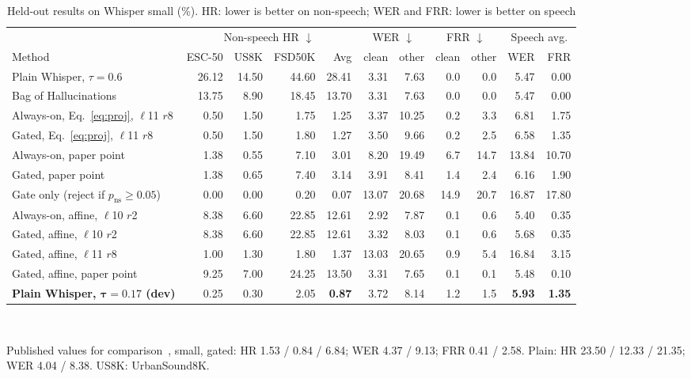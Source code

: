 \documentclass[conference,a4paper]{IEEEtran}
\newcommand{\pns}{p_{\mathrm{ns}}}
\begin{document}
\begin{table}[!t]
\centering
\caption{Held-out results on Whisper small (\%). HR: lower is better on non-speech; WER and FRR: lower is better on speech}
\label{tab:main}
\setlength{\tabcolsep}{5pt}
\begin{tabular}{@{}l rrr r rr rr rr@{}}
\toprule
& \multicolumn{4}{c}{Non-speech HR $\downarrow$} & \multicolumn{2}{c}{WER $\downarrow$} & \multicolumn{2}{c}{FRR $\downarrow$} & \multicolumn{2}{c}{Speech avg.} \\
\cmidrule(lr){2-5}\cmidrule(lr){6-7}\cmidrule(lr){8-9}\cmidrule(l){10-11}
Method & ESC-50 & US8K & FSD50K & Avg & clean & other & clean & other & WER & FRR \\
\midrule
Plain Whisper, $\tau = 0.6$ & 26.12 & 14.50 & 44.60 & 28.41 & 3.31 & 7.63 & 0.0 & 0.0 & 5.47 & 0.00 \\
Bag of Hallucinations~\cite{baranski2025boh} & 13.75 & 8.90 & 18.45 & 13.70 & 3.31 & 7.63 & 0.0 & 0.0 & 5.47 & 0.00 \\
\midrule
Always-on, Eq.~\eqref{eq:proj}, $\ell$11 $r$8 & 0.50 & 1.50 & 1.75 & 1.25 & 3.37 & 10.25 & 0.2 & 3.3 & 6.81 & 1.75 \\
Gated, Eq.~\eqref{eq:proj}, $\ell$11 $r$8 & 0.50 & 1.50 & 1.80 & 1.27 & 3.50 & 9.66 & 0.2 & 2.5 & 6.58 & 1.35 \\
Always-on, paper point & 1.38 & 0.55 & 7.10 & 3.01 & 8.20 & 19.49 & 6.7 & 14.7 & 13.84 & 10.70 \\
Gated, paper point & 1.38 & 0.65 & 7.40 & 3.14 & 3.91 & 8.41 & 1.4 & 2.4 & 6.16 & 1.90 \\
Gate only (reject if $\pns \ge 0.05$) & 0.00 & 0.00 & 0.20 & 0.07 & 13.07 & 20.68 & 14.9 & 20.7 & 16.87 & 17.80 \\
\midrule
Always-on, affine, $\ell$10 $r$2 & 8.38 & 6.60 & 22.85 & 12.61 & 2.92 & 7.87 & 0.1 & 0.6 & 5.40 & 0.35 \\
Gated, affine, $\ell$10 $r$2 & 8.38 & 6.60 & 22.85 & 12.61 & 3.32 & 8.03 & 0.1 & 0.6 & 5.68 & 0.35 \\
Gated, affine, $\ell$11 $r$8 & 1.00 & 1.30 & 1.80 & 1.37 & 13.03 & 20.65 & 0.9 & 5.4 & 16.84 & 3.15 \\
Gated, affine, paper point & 9.25 & 7.00 & 24.25 & 13.50 & 3.31 & 7.65 & 0.1 & 0.1 & 5.48 & 0.10 \\
\midrule
\textbf{Plain Whisper, $\boldsymbol{\tau = 0.17}$ (dev)} & 0.25 & 0.30 & 2.05 & \textbf{0.87} & 3.72 & 8.14 & 1.2 & 1.5 & \textbf{5.93} & \textbf{1.35} \\
\bottomrule
\end{tabular}\\[3pt]
\parbox{\textwidth}{\footnotesize Published values for comparison~\cite{abbasi2026hsp}, small, gated: HR 1.53 / 0.84 / 6.84; WER 4.37 / 9.13; FRR 0.41 / 2.58. Plain: HR 23.50 / 12.33 / 21.35; WER 4.04 / 8.38. US8K: UrbanSound8K.}
\end{table}
\end{document}
